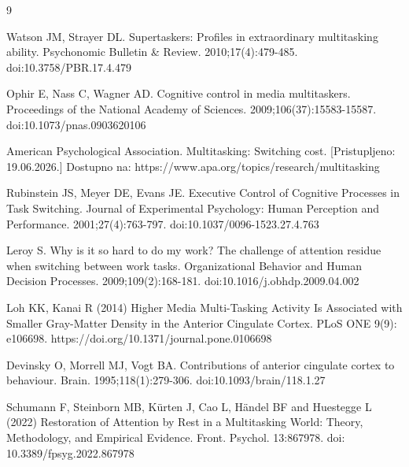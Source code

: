 \documentclass[12pt,a4paper]{article}
\begin{document}
\begin{thebibliography}{9}

Watson JM, Strayer DL. Supertaskers: Profiles in extraordinary multitasking ability. Psychonomic Bulletin \& Review. 2010;17(4):479-485. doi:10.3758/PBR.17.4.479

Ophir E, Nass C, Wagner AD. Cognitive control in media multitaskers. Proceedings of the National Academy of Sciences. 2009;106(37):15583-15587. doi:10.1073/pnas.0903620106

American Psychological Association. Multitasking: Switching cost.
[Pristupljeno: 19.06.2026.] Dostupno na: https://www.apa.org/topics/research/multitasking

Rubinstein JS, Meyer DE, Evans JE. Executive Control of Cognitive Processes in Task Switching. Journal of Experimental Psychology: Human Perception and Performance. 2001;27(4):763-797. doi:10.1037/0096-1523.27.4.763


Leroy S. Why is it so hard to do my work? The challenge of attention residue when switching between work tasks. Organizational Behavior and Human Decision Processes. 2009;109(2):168-181. doi:10.1016/j.obhdp.2009.04.002


Loh KK, Kanai R (2014) Higher Media Multi-Tasking Activity Is Associated with Smaller Gray-Matter Density in the Anterior Cingulate Cortex. PLoS ONE 9(9): e106698. https://doi.org/10.1371/journal.pone.0106698


Devinsky O, Morrell MJ, Vogt BA. Contributions of anterior cingulate cortex to behaviour. Brain. 1995;118(1):279-306. doi:10.1093/brain/118.1.27


Schumann F, Steinborn MB, Kürten J, Cao L, Händel BF and Huestegge L (2022) Restoration of Attention by Rest in a Multitasking World: Theory, Methodology, and Empirical Evidence. Front. Psychol. 13:867978. doi: 10.3389/fpsyg.2022.867978

\end{thebibliography}
\end{document}
